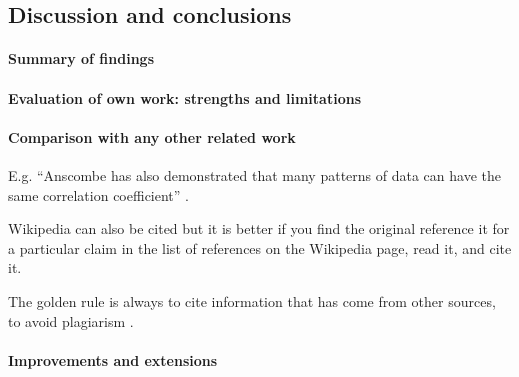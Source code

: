 \documentclass[10pt,a4paper]{article}
\begin{document}
\begin{multicols}{2}



\section{Discussion and conclusions}

\paragraph{Summary of findings}

\paragraph{Evaluation of own work: strengths and limitations}

\paragraph{Comparison with any other related work}
E.g. ``Anscombe has also demonstrated that many patterns of data can
have the same correlation coefficient'' \cite{anscombe1973graphs}.

Wikipedia can also be cited but it is better if you find the original
reference it for a particular claim in the list of references on the
Wikipedia page, read it, and cite it.

The golden rule is always to cite information that has come from other
sources, to avoid plagiarism \cite{wiki:plagarism}. \cite{HowMuchDoesEloMatter}

\paragraph{Improvements and extensions}

\end{multicols}

\printbibliography
\end{document}

